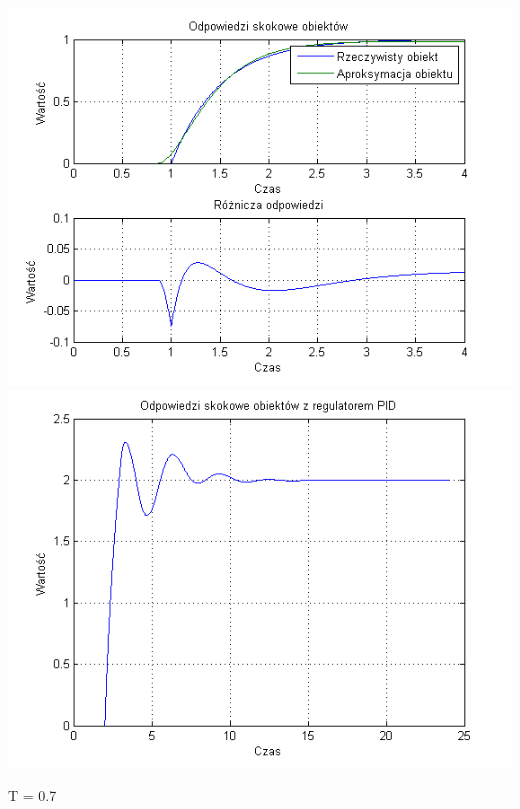 \documentclass[10pt,a4paper]{article}
\begin{document}
\begin{center}
\includegraphics[scale=1]{images/dwa/skrypt_11.png}\\
\includegraphics[scale=1]{images/dwa/skrypt_12.png}\\
\end{center}
\newpage
T = 0.7
\end{document}
